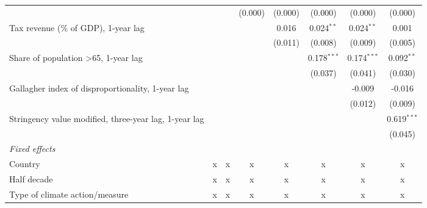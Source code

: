 \begin{tabular}{lccccccc}
                                                                         &                &                & (0.000)        & (0.000)        & (0.000)        & (0.000)        & (0.000)\\   
   Tax revenue (\% of GDP), 1-year lag                                   &                &                &                & 0.016          & 0.024$^{**}$   & 0.024$^{**}$   & 0.001\\   
                                                                         &                &                &                & (0.011)        & (0.008)        & (0.009)        & (0.005)\\   
   Share of population >65, 1-year lag                                   &                &                &                &                & 0.178$^{***}$  & 0.174$^{***}$  & 0.092$^{**}$\\   
                                                                         &                &                &                &                & (0.037)        & (0.041)        & (0.030)\\   
   Gallagher index of disproportionality, 1-year lag                     &                &                &                &                &                & -0.009         & -0.016\\   
                                                                         &                &                &                &                &                & (0.012)        & (0.009)\\   
   Stringency value modified, three-year lag, 1-year lag                 &                &                &                &                &                &                & 0.619$^{***}$\\   
                                                                         &                &                &                &                &                &                & (0.045)\\   
   \emph{Fixed effects}\\
   Country                                                               & x              & x              & x              & x              & x              & x              & x\\  
   Half decade                                                           & x              & x              & x              & x              & x              & x              & x\\  
   Type of climate action/measure                                        & x              & x              & x              & x              & x              & x              & x\\  

\end{tabular}
